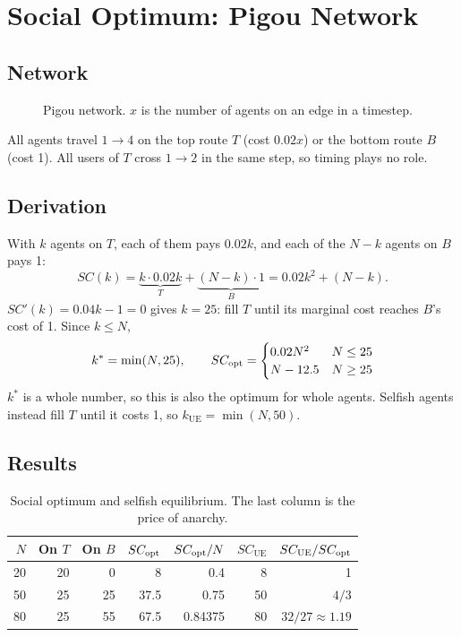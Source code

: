 \documentclass[11pt]{article}
\begin{document}
\section{Social Optimum: Pigou Network}

\subsection{Network}

\begin{figure}[H]
  \centering
  
  \caption{Pigou network. $x$ is the number of agents on an edge in a timestep.}
\end{figure}

All agents travel $1 \to 4$ on the top route $T$ (cost $0.02x$) or the bottom route $B$ (cost 1). All users
of $T$ cross $1 \to 2$ in the same step, so timing plays no role.

\subsection{Derivation}

With $k$ agents on $T$, each of them pays $0.02k$, and each of the $N - k$ agents on $B$ pays 1:
\[
  SC(k) = \underbrace{k \cdot 0.02k}_{T} + \underbrace{(N - k) \cdot 1}_{B} = 0.02k^2 + (N - k).
\]
$SC'(k) = 0.04k - 1 = 0$ gives $k = 25$: fill $T$ until its marginal cost reaches $B$'s cost of 1. Since
$k \le N$,
\[
  k^* = \min(N, 25), \qquad
  SC_{\mathrm{opt}} = \begin{cases} 0.02N^2 & N \le 25 \\ N - 12.5 & N \ge 25 \end{cases}
\]
$k^*$ is a whole number, so this is also the optimum for whole agents. Selfish agents instead fill $T$
until it costs 1, so $k_{\mathrm{UE}} = \min(N, 50)$.

\subsection{Results}

\begin{table}[H]
\centering
\begin{tabular}{@{}rrrrrrr@{}}
\toprule
$N$ & On $T$ & On $B$ & $SC_{\mathrm{opt}}$ & $SC_{\mathrm{opt}}/N$ & $SC_{\mathrm{UE}}$ & $SC_{\mathrm{UE}}/SC_{\mathrm{opt}}$ \\
\midrule
20 & 20 & 0  & 8    & 0.4     & 8  & 1 \\
50 & 25 & 25 & 37.5 & 0.75    & 50 & $4/3$ \\
80 & 25 & 55 & 67.5 & 0.84375 & 80 & $32/27 \approx 1.19$ \\
\bottomrule
\end{tabular}
\caption{Social optimum and selfish equilibrium. The last column is the price of anarchy.}
\end{table}
\end{document}

